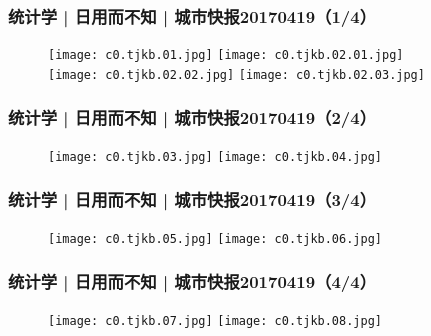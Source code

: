 \begin{frame}
  \frametitle{统计学 | 日用而不知 | 城市快报20170419（1/4）}
  \begin{figure}
    \centering
    \texttt{[image: c0.tjkb.01.jpg]}\quad
    \texttt{[image: c0.tjkb.02.01.jpg]}\\
    \texttt{[image: c0.tjkb.02.02.jpg]}\quad
    \texttt{[image: c0.tjkb.02.03.jpg]}\\
  \end{figure}
\end{frame}

\begin{frame}
  \frametitle{统计学 | 日用而不知 | 城市快报20170419（2/4）}
  \begin{figure}
    \centering
    \texttt{[image: c0.tjkb.03.jpg]}\quad
    \texttt{[image: c0.tjkb.04.jpg]}
  \end{figure}
\end{frame}

\begin{frame}
  \frametitle{统计学 | 日用而不知 | 城市快报20170419（3/4）}
  \begin{figure}
    \centering
    \texttt{[image: c0.tjkb.05.jpg]}\quad
    \texttt{[image: c0.tjkb.06.jpg]}
  \end{figure}
\end{frame}

\begin{frame}
  \frametitle{统计学 | 日用而不知 | 城市快报20170419（4/4）}
  \begin{figure}
    \centering
    \texttt{[image: c0.tjkb.07.jpg]}\quad
    \texttt{[image: c0.tjkb.08.jpg]}
  \end{figure}
\end{frame}

